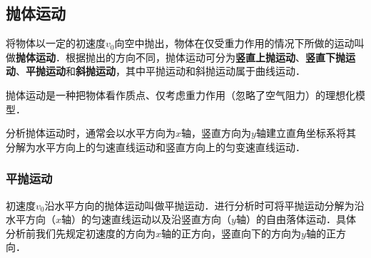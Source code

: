 \subsection{抛体运动}
将物体以一定的初速度$v_0$向空中抛出，物体在仅受重力作用的情况下所做的运动叫做\textbf{抛体运动}．根据抛出的方向不同，抛体运动可分为\textbf{竖直上抛运动}、\textbf{竖直下抛运动}、\textbf{平抛运动}和\textbf{斜抛运动}，其中平抛运动和斜抛运动属于曲线运动．

抛体运动是一种把物体看作质点、仅考虑重力作用（忽略了空气阻力）的理想化模型．

分析抛体运动时，通常会以水平方向为$x$轴，竖直方向为$y$轴建立直角坐标系将其分解为水平方向上的匀速直线运动和竖直方向上的匀变速直线运动．

\subsubsection{平抛运动}
初速度$v_0$沿水平方向的抛体运动叫做平抛运动．进行分析时可将平抛运动分解为沿水平方向（$x$轴）的匀速直线运动以及沿竖直方向（$y$轴）的自由落体运动．具体分析前我们先规定初速度的方向为$x$轴的正方向，竖直向下的方向为$y$轴的正方向．

